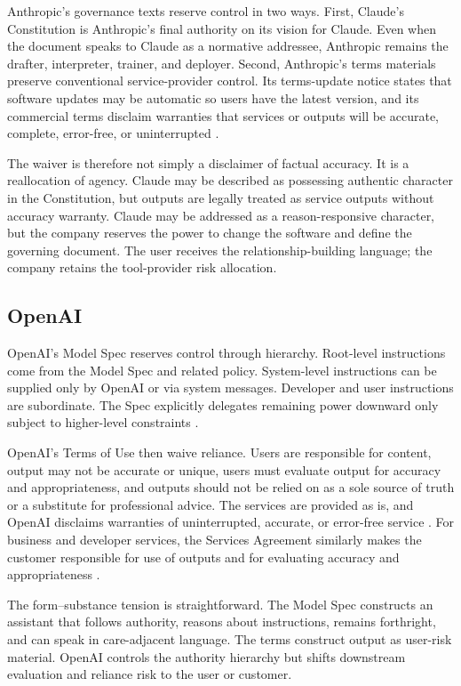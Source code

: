 \documentclass[11pt,a4paper]{article}
\begin{document}
Anthropic's governance texts reserve control in two ways. First, Claude's Constitution is Anthropic's final authority on its vision for Claude. Even when the document speaks to Claude as a normative addressee, Anthropic remains the drafter, interpreter, trainer, and deployer. Second, Anthropic's terms materials preserve conventional service-provider control. Its terms-update notice states that software updates may be automatic so users have the latest version, and its commercial terms disclaim warranties that services or outputs will be accurate, complete, error-free, or uninterrupted \citep{anthropic2026termsupdates,anthropic2024commercialterms}.

The waiver is therefore not simply a disclaimer of factual accuracy. It is a reallocation of agency. Claude may be described as possessing authentic character in the Constitution, but outputs are legally treated as service outputs without accuracy warranty. Claude may be addressed as a reason-responsive character, but the company reserves the power to change the software and define the governing document. The user receives the relationship-building language; the company retains the tool-provider risk allocation.

\subsection{OpenAI}

OpenAI's Model Spec reserves control through hierarchy. Root-level instructions come from the Model Spec and related policy. System-level instructions can be supplied only by OpenAI or via system messages. Developer and user instructions are subordinate. The Spec explicitly delegates remaining power downward only subject to higher-level constraints \citep{openai2025modelspec}.

OpenAI's Terms of Use then waive reliance. Users are responsible for content, output may not be accurate or unique, users must evaluate output for accuracy and appropriateness, and outputs should not be relied on as a sole source of truth or a substitute for professional advice. The services are provided as is, and OpenAI disclaims warranties of uninterrupted, accurate, or error-free service \citep{openai2026termsofuse}. For business and developer services, the Services Agreement similarly makes the customer responsible for use of outputs and for evaluating accuracy and appropriateness \citep{openai2026servicesagreement}.

The form--substance tension is straightforward. The Model Spec constructs an assistant that follows authority, reasons about instructions, remains forthright, and can speak in care-adjacent language. The terms construct output as user-risk material. OpenAI controls the authority hierarchy but shifts downstream evaluation and reliance risk to the user or customer.
\end{document}
